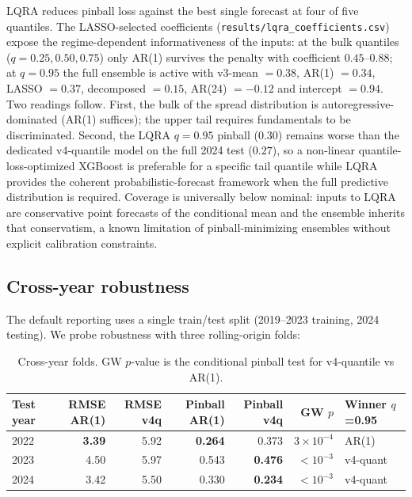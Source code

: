 \documentclass[11pt,a4paper]{article}
\begin{document}
LQRA reduces pinball loss against the best single forecast at four
of five quantiles. The LASSO-selected coefficients
(\texttt{results/lqra\_coefficients.csv}) expose the
regime-dependent informativeness of the inputs: at the bulk quantiles
($q = 0.25, 0.50, 0.75$) only AR(1) survives the penalty with
coefficient $0.45$--$0.88$; at $q = 0.95$ the full ensemble is active
with v3-mean $= 0.38$, AR(1) $= 0.34$, LASSO $= 0.37$, decomposed
$= 0.15$, AR(24) $= -0.12$ and intercept $= 0.94$. Two readings
follow. First, the bulk of the spread distribution is autoregressive-
dominated (AR(1) suffices); the upper tail requires fundamentals to
be discriminated. Second, the LQRA $q = 0.95$ pinball ($0.30$)
remains worse than the dedicated v4-quantile model on the full 2024
test ($0.27$), so a non-linear quantile-loss-optimized XGBoost is
preferable for a specific tail quantile while LQRA provides the
coherent probabilistic-forecast framework when the full predictive
distribution is required. Coverage is universally below nominal:
inputs to LQRA are conservative point forecasts of the conditional
mean and the ensemble inherits that conservatism, a known limitation
of pinball-minimizing ensembles without explicit calibration
constraints.

\subsection{Cross-year robustness}\label{sec:cross-year}

The default reporting uses a single train/test split
(2019--2023 training, 2024 testing). We probe robustness with three
rolling-origin folds:

\begin{table}[H]
\centering
\small
\caption{Cross-year folds. GW $p$-value is the conditional pinball
test for v4-quantile vs AR(1).}
\label{tab:cv-years}
\begin{tabular}{lrrrrrl}
\toprule
\textbf{Test year} & \textbf{RMSE AR(1)} & \textbf{RMSE v4q}
                  & \textbf{Pinball AR(1)} & \textbf{Pinball v4q}
                  & \textbf{GW $p$} & \textbf{Winner $q$=0.95} \\
\midrule
2022 & \textbf{3.39} & 5.92 & \textbf{0.264} & 0.373 & $3 \times 10^{-4}$ & AR(1) \\
2023 & 4.50 & 5.97 & 0.543 & \textbf{0.476} & $< 10^{-3}$ & v4-quant \\
2024 & 3.42 & 5.50 & 0.330 & \textbf{0.234} & $< 10^{-3}$ & v4-quant \\
\bottomrule
\end{tabular}
\end{table}
\end{document}
